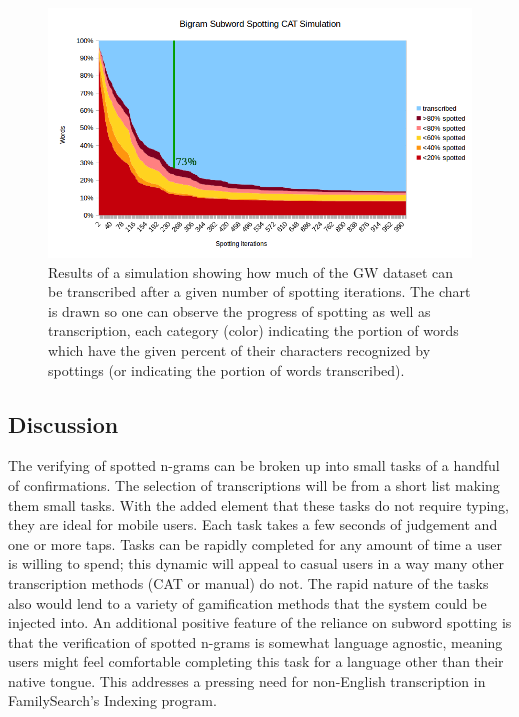 \documentclass[conference]{IEEEtran}
\begin{document}
{%

\begin{figure}
    \centering
    \includegraphics[width=.49\textwidth]{simulationGraph_big_line}
    \caption{Results of a simulation showing how much of the GW dataset can be transcribed after a given number of spotting iterations. The chart is drawn so one can observe the progress of spotting as well as transcription, each category (color) indicating the portion of words which have the given percent of their characters recognized by spottings (or indicating the portion of words transcribed).}
    \label{fig:fullSim}
\end{figure}

\subsection{Discussion}

The verifying of spotted n-grams can be broken up into small tasks of a handful of confirmations. The selection of transcriptions will be from a short list making them small tasks. With the added element that these tasks do not require typing, they are ideal for mobile users. Each task takes a few seconds of judgement and one or more taps. Tasks can be rapidly completed for any amount of time a user is willing to spend; this dynamic will appeal to casual users in a way many other transcription methods (CAT or manual) do not. The rapid nature of the tasks also would lend to a variety of gamification methods that the system could be injected into. An additional positive feature of the reliance on subword spotting is that the verification of spotted n-grams is somewhat language agnostic, meaning users might feel comfortable completing this task for a language other than their native tongue. This addresses a pressing need for non-English transcription in FamilySearch's Indexing program.


}
\end{document}

